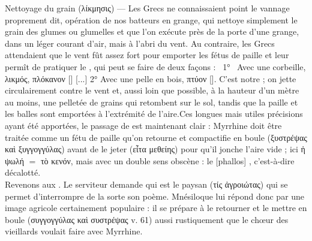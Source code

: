 {{Nettoyage du grain (λίκμησις)  — Les Grecs ne connaissaient point le vannage proprement dit, opération de nos batteurs en grange, qui nettoye simplement le grain des glumes ou glumelles et que l'on exécute près de la porte d’une grange, dans un léger courant d'air, mais à l'abri du vent. Au contraire, les Grecs attendaient que le vent fût assez fort pour emporter les fétus de paille et leur permît de pratiquer le , qui peut se faire de deux façons :  1°  Avec une corbeille, λικμός, πλόκανον [] [...]    2°   Avec une pelle en bois, πτύον []. C'est notre  ; on jette circulairement contre le vent et, aussi loin que possible, à la hauteur d’un mètre au moins, une pelletée de grains qui retombent sur le sol, tandis que la paille et les balles sont emportées à l'extrémité de l'aire.}Ces longues mais utiles précisions ayant été apportées, le passage de  est maintenant clair : Myrrhine doit être traitée comme un fétu de paille qu'on retourne et compactifie en boule (ξυστρέψας καὶ ξυγγογγύλας) avant de le jeter (εἶτα μεθείης) pour qu'il jonche l'aire vide ; ici ἡ ψωλή $=$ τὸ κενόν, mais avec un double sens obscène : le [phallos] , c'est-à-dire décalotté.\\
Revenons aux . Le serviteur demande qui est le paysan (τίς ἀγροιώτας) qui se permet d'interrompre de la sorte son poème. Mnésiloque lui répond donc par une image agricole certainement populaire : il se prépare à le retourner et le mettre en boule (συγγογγύλας καὶ συστρέψας v. 61) aussi rustiquement que le chœur des vieillards voulait faire avec Myrrhine.}
